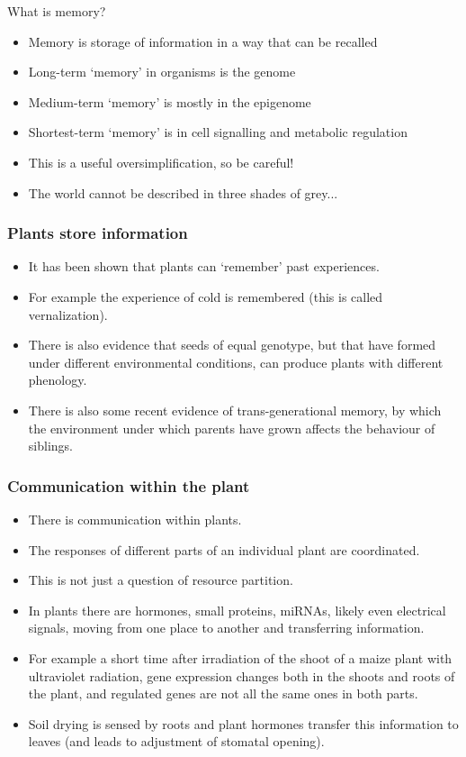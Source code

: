 \documentclass[10pt]{beamer}
\begin{document}
\begin{frame}{What is memory?}
\begin{itemize}
  \item Memory is storage of information in a way that can be recalled
  \item Long-term `memory' in organisms is the genome
  \item Medium-term `memory' is mostly in the epigenome
  \item Shortest-term `memory' is in cell signalling and metabolic regulation
  \item This is a useful oversimplification, so be careful!
  \item The world cannot be described in three shades of grey...
\end{itemize}
\end{frame}

\begin{frame}
\frametitle{Plants store information}
  \begin{itemize}
    \item It has been shown that plants can `remember' past experiences.
    \item For example the experience of cold is remembered (this is called vernalization).
    \item There is also evidence that seeds of equal genotype, but that have formed under different environmental conditions, can produce plants with different phenology.
    \item There is also some recent evidence of trans-generational memory, by which the environment under which parents have grown affects the behaviour of siblings.
  \end{itemize}
\end{frame}

\begin{frame}
\frametitle{Communication within the plant}
  \begin{itemize}
    \item There is communication within plants.
    \item The responses of different parts of an individual plant are coordinated.
    \item This is not just a question of resource partition.
    \item In plants there are hormones, small proteins, miRNAs, likely even electrical signals, moving from one place to another and transferring information.
    \item For example a short time after irradiation of the shoot of a maize plant with ultraviolet radiation, gene expression changes both in the shoots and roots of the plant, and regulated genes are not all the same ones in both parts.
    \item Soil drying is sensed by roots and plant hormones transfer this information to leaves (and leads to adjustment of stomatal opening).
  \end{itemize}
\end{frame}
\end{document}
